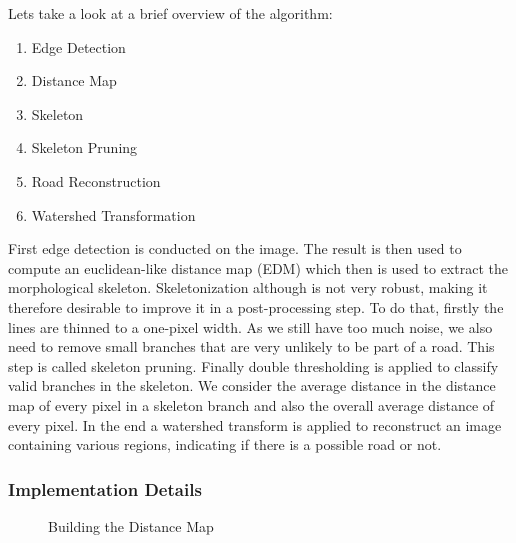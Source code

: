 \documentclass[10pt,conference,compsocconf]{IEEEtran}
\begin{document}
Lets take a look at a brief overview of the algorithm:
\begin{enumerate}
	\item Edge Detection
	\item Distance Map
	\item Skeleton
	\item Skeleton Pruning
	\item Road Reconstruction
	\item Watershed Transformation
\end{enumerate}
First edge detection is conducted on the image. The result is then used to compute an euclidean-like distance map (EDM) which then is used to extract the morphological skeleton. Skeletonization although is not very robust, making it therefore desirable to improve it in a post-processing step. To do that, firstly the lines are thinned to a one-pixel width. As we still have too much noise, we also need to remove small branches that are very unlikely to be part of a road. This step is called skeleton pruning. Finally double thresholding is applied to classify valid branches in the skeleton. We consider the average distance in the distance map of every pixel in a skeleton branch and also the overall average distance of every pixel. In the end a watershed transform is applied to reconstruct an image containing various regions, indicating if there is a possible road or not.

\subsubsection{Implementation Details} \hspace*{\fill}

\begin{figure}[tp]
	\centering
	\hspace{0.025\linewidth}
	\caption{Building the Distance Map}
\end{figure}
\end{document}
